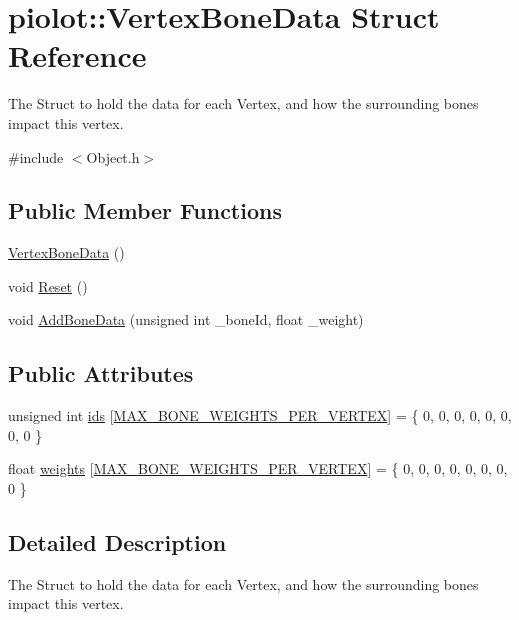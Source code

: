 \hypertarget{structpiolot_1_1_vertex_bone_data}{}\section{piolot\+:\+:Vertex\+Bone\+Data Struct Reference}
\label{structpiolot_1_1_vertex_bone_data}


The Struct to hold the data for each Vertex, and how the surrounding bones impact this vertex.  




{\ttfamily \#include $<$Object.\+h$>$}

\subsection*{Public Member Functions}
\begin{DoxyCompactItemize}
\item 
\mbox{\hyperlink{structpiolot_1_1_vertex_bone_data_aa7f5f7e0631ba20d1e004e03518ceddd}{Vertex\+Bone\+Data}} ()
\item 
void \mbox{\hyperlink{structpiolot_1_1_vertex_bone_data_a1add9d54fb68b18643166141cc0e9c7f}{Reset}} ()
\item 
void \mbox{\hyperlink{structpiolot_1_1_vertex_bone_data_adb67999e6cbfa76d7976e9f976e03e8d}{Add\+Bone\+Data}} (unsigned int \+\_\+bone\+Id, float \+\_\+weight)
\end{DoxyCompactItemize}
\subsection*{Public Attributes}
\begin{DoxyCompactItemize}
\item 
unsigned int \mbox{\hyperlink{structpiolot_1_1_vertex_bone_data_a109f771b8096564ebd8011d3444e52b1}{ids}} \mbox{[}\mbox{\hyperlink{_object_8h_ab50eab88f228256df8f255a597fadaf1}{M\+A\+X\+\_\+\+B\+O\+N\+E\+\_\+\+W\+E\+I\+G\+H\+T\+S\+\_\+\+P\+E\+R\+\_\+\+V\+E\+R\+T\+EX}}\mbox{]} = \{ 0, 0, 0, 0, 0, 0, 0, 0 \}
\item 
float \mbox{\hyperlink{structpiolot_1_1_vertex_bone_data_a09ed8f4a42757f4708c1ed3672fbe2d1}{weights}} \mbox{[}\mbox{\hyperlink{_object_8h_ab50eab88f228256df8f255a597fadaf1}{M\+A\+X\+\_\+\+B\+O\+N\+E\+\_\+\+W\+E\+I\+G\+H\+T\+S\+\_\+\+P\+E\+R\+\_\+\+V\+E\+R\+T\+EX}}\mbox{]} = \{ 0, 0, 0, 0, 0, 0, 0, 0 \}
\end{DoxyCompactItemize}


\subsection{Detailed Description}
The Struct to hold the data for each Vertex, and how the surrounding bones impact this vertex. 

